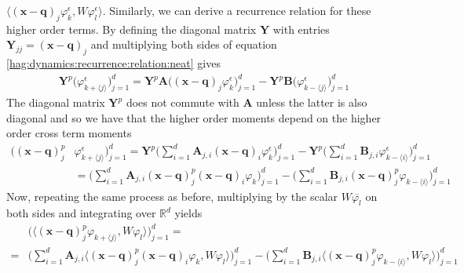 $\langle (\bm{x} - \bm{q})_j \varphi^\epsilon_{k}, W \varphi^\epsilon_l \rangle $.
Similarly, we can derive a recurrence relation for these higher order terms.
By defining the diagonal matrix $\bm{Y}$ 
with entries $\bm{Y}_{jj} = (\bm{x} - \bm{q})_j$
and multiplying both sides of equation 
\eqref{hag:dynamics:recurrence:relation:neat} gives 
\begin{equation}
  \begin{split}
    \bm{Y}^p\Big(\varphi^\epsilon_{k + \langle j \rangle}\Big)_{j=1}^d
    =
    \bm{Y}^p\bm{A} \Big( 
      (\bm{x} - \bm{q})_{j}\varphi^\epsilon_k
    \Big)_{j=1}^d
    - \bm{Y}^p\bm{B} \Big(
      \varphi^\epsilon_{k - \langle j  \rangle}
      \Big)_{j=1}^d
  \end{split}
\end{equation}
The diagonal matrix $\bm{Y}^p$ does not commute with 
$\bm{A}$ unless the latter is also diagonal and so we have
that the higher order moments depend on the higher order 
cross term moments
\begin{equation}
  \begin{split}
    \Big((\bm{x} - \bm{q})_j^p &
    \varphi^\epsilon_{k + \langle j \rangle}\Big)_{j=1}^d
    =
    \bm{Y}^p
    \Big(
      \sum_{i=1}^d
     \bm{A}_{j,i} 
     (\bm{x} - \bm{q})_{i}\varphi^\epsilon_k
    \Big)_{j=1}^d
    - \bm{Y}^p \Big(
      \sum_{i=1}^d
      \bm{B}_{j,i}
      \varphi^\epsilon_{k - \langle i  \rangle}
      \Big)_{j=1}^d
      \\
    &= 
    \Big(
      \sum_{i=1}^d
     \bm{A}_{j,i} 
     (\bm{x} - \bm{q})^p_j(\bm{x} - \bm{q})_{i}\varphi_k
    \Big)_{j=1}^d
    - \Big(
      \sum_{i=1}^d
      \bm{B}_{j,i}
      (\bm{x}-\bm{q})_j^p
      \varphi_{k - \langle i  \rangle}
      \Big)_{j=1}^d
  \end{split}
\end{equation}
Now, repeating the same process as before, 
multiplying by the scalar $W\overline{\varphi_l}$
on both sides and integrating over $\mathbb{R}^d$ 
yields 
\begin{equation}
  \begin{split}
    &\Big(
      \langle (\bm{x} - \bm{q})_j^p 
    \varphi_{k + \langle j \rangle},
    W \varphi_l \rangle
  \Big)_{j=1}^d
    =
    \\
      =&
    \Big(
      \sum_{i=1}^d
     \bm{A}_{j,i} 
     \langle (\bm{x} - \bm{q})^p_j(\bm{x} - \bm{q})_{i}\varphi_k, 
    W \varphi_l \rangle
    \Big)_{j=1}^d
    - \Big(
      \sum_{i=1}^d
      \bm{B}_{j,i}
      \langle 
      (\bm{x} - \bm{q})_j^p
      \varphi_{k - \langle i  \rangle}
      , W \varphi_l \rangle
      \Big)_{j=1}^d
  \end{split}
  \label{hag:dynamics:recurrence:relation:inner:product:p}
\end{equation}
